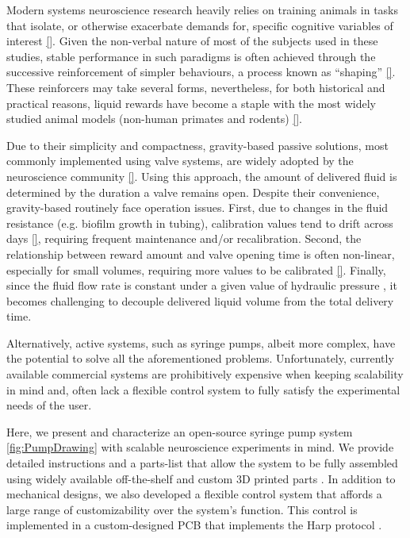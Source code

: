 Modern systems neuroscience research heavily relies on training animals in tasks that isolate, or otherwise exacerbate demands for, specific cognitive variables of interest \ref{}. Given the non-verbal nature of most of the subjects used in these studies, stable performance in such paradigms is often achieved through the successive reinforcement of simpler behaviours, a process known as “shaping” \ref{}. These reinforcers may take several forms, nevertheless, for both historical and practical reasons, liquid rewards have become a staple with the most widely studied animal models (non-human primates and rodents) \ref{}. 

Due to their simplicity and compactness, gravity-based passive solutions, most commonly implemented using valve systems, are widely adopted by the neuroscience community \ref{}. Using this approach, the amount of delivered fluid is determined by the duration a valve remains open. Despite their convenience, gravity-based routinely face operation issues. First, due to changes in the fluid resistance (e.g. biofilm growth in tubing), calibration values tend to drift across days \ref{}, requiring frequent maintenance and/or recalibration. Second, the relationship between reward amount and valve opening time is often non-linear, especially for small volumes, requiring more values to be calibrated \ref{}. Finally, since the fluid flow rate is constant under a given value of hydraulic pressure \cite{}, it becomes challenging to decouple delivered liquid volume from the total delivery time.

Alternatively, active systems, such as syringe pumps, albeit more complex, have the potential to solve all the aforementioned problems. Unfortunately, currently available commercial systems are prohibitively expensive when keeping scalability in mind and, often lack a flexible control system to fully satisfy the experimental needs of the user.

Here, we present and characterize an open-source syringe pump system \ref{fig:PumpDrawing} with scalable neuroscience experiments in mind. We provide detailed instructions and a parts-list that allow the system to be fully assembled using widely available off-the-shelf and custom 3D printed parts . 
In addition to mechanical designs, we also developed a flexible control system that affords a large range of customizability over the system's function. This control is implemented in a custom-designed PCB that implements the Harp protocol  .

